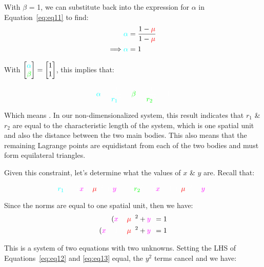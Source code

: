 With $\beta$ = 1, we can substitute back into the expression for $\alpha$ in Equation~\eqref{eq:eq11} to find:
\begin{align*}
    \cc \alpha \cw                 & = \ddfrac{1-\cred\mu}{1-\cred\mu}
    \\
    \Longrightarrow \cc \alpha \cw & = 1
\end{align*}

With $
    \begin{bmatrix}
        \cc \alpha \\
        \cg \beta
    \end{bmatrix}
    =
    \begin{bmatrix}
        1 \\
        1
    \end{bmatrix}
$, this implies that:

\begin{equation*}
    \cc \alpha \cw = \ddfrac{1}{\cc r_1 \cw ^3} = \cg \beta \cw = \ddfrac{1}{\cg r_2 \cw ^3} = 1
\end{equation*}

Which means . In our non-dimensionalized system, this result indicates that $r_1$ \& $r_2$ are equal to the characteristic length of the system, which is one spatial unit and also the distance between the two main bodies. This also means that the remaining Lagrange points are equidistant from each of the two bodies and must form equilateral triangles.

\vspace{\baselineskip}

Given this constraint, let's determine what the values of $x$ \& $y$ are. Recall that:

\begin{equation*}
    \cc r_1 \cw ^2 = \left(\cm x \cw + \cred \mu \cw\right)^2 + \cm y \cw ^2
    \qquad \cg r_2 \cw ^2 = \left(\cm x \cw - 1 + \cred \mu \cw\right)^2 + \cm y \cw ^2
\end{equation*}

Since the norms are equal to one spatial unit, then we have:
\begin{align}
    \left(\cm x \cw + \cred \mu \cw\right)^2 + \cm y \cw ^2     & = 1 \label{eq:eq12}
    \\
    \left(\cm x \cw - 1 + \cred \mu \cw\right)^2 + \cm y \cw ^2 & = 1 \label{eq:eq13}
\end{align}

This is a system of two equations with two unknowns. Setting the LHS of Equations~\eqref{eq:eq12} and \eqref{eq:eq13} equal, the $y^2$ terms cancel and we have:

